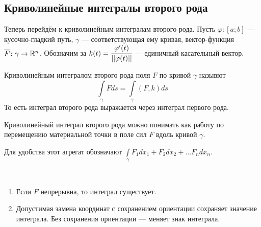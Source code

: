\subsection{Криволинейные интегралы второго рода}
Теперь перейдём к криволинейным интегралам второго рода. Пусть $\varphi\colon [a;b]$ --- кусочно-гладкий путь, $\gamma$ --- соответствующая ему кривая, вектор-функция $\overline{F} \colon \gamma \to \mathbb{R}^n$. Обозначим за $k(t) = \cfrac{\varphi'(t)}{||\varphi(t)||}$ --- единичный касательный вектор.
\begin{Def}
    Криволинейным интегралом второго рода поля $F$ по кривой $\gamma$ назывют
    $$
        \int\limits_\gamma Fds = \int\limits_{\gamma} (F, k)ds
    $$
    То есть интеграл второго рода выражается через интеграл первого рода.
\end{Def}
Криволинейный интеграл второго рода можно понимать как работу по перемещению материальной точки в поле сил $F$ вдоль кривой $\gamma$.
\par Для удобства этот агрегат обозначают $\int\limits_\gamma F_1dx_1 + F_2dx_2 + \ldots F_ndx_n$. 
\begin{Properties}\ \\
    \begin{enumerate}
        \item Если $F$ непрерывна, то интеграл существует.
        \item Допустимая замена координат с сохранением ориентации сохраняет значение интеграла. Без сохранения ориентации --- меняет знак интеграла.
    \end{enumerate}
\end{Properties}
